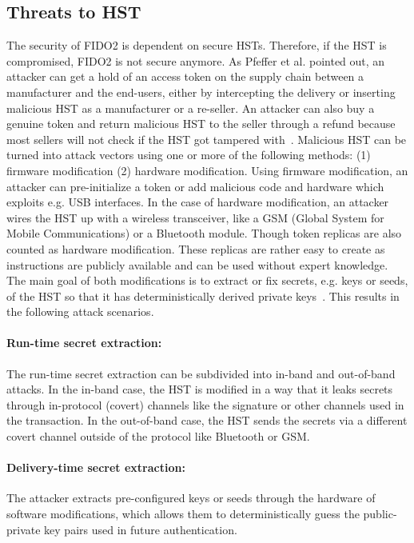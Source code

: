 \documentclass[runningheads]{llncs}
\begin{document}
\subsection{Threats to HST}
The security of FIDO2 is dependent on secure HSTs. Therefore, if the HST is compromised, FIDO2 is not secure anymore. As Pfeffer et al. pointed out, an attacker can get a hold of an access token on the supply chain between a manufacturer and the end-users, either by intercepting the delivery or inserting malicious HST as a manufacturer or a re-seller. An attacker can also buy a genuine token and return malicious HST to the seller through a refund because most sellers will not check if the HST got tampered with~\cite{000007}. Malicious HST can be turned into attack vectors using one or more of the following methods: (1) firmware modification (2) hardware modification. Using firmware modification, an attacker can pre-initialize a token or add malicious code and hardware which exploits e.g. USB interfaces. In the case of hardware modification, an attacker wires the HST up with a wireless transceiver, like a GSM (Global System for Mobile Communications) or a Bluetooth module. Though token replicas are also counted as hardware modification. These replicas are rather easy to create as instructions are publicly available and can be used without expert knowledge. The main goal of both modifications is to extract or fix secrets, e.g. keys or seeds, of the HST so that it has deterministically derived private keys~\cite{272198}. This results in the following attack scenarios.

\paragraph{Run-time secret extraction:}
The run-time secret extraction can be subdivided into in-band and out-of-band attacks. In the in-band case, the HST is modified in a way that it leaks secrets through in-protocol (covert) channels like the signature or other channels used in the transaction. In the out-of-band case, the HST sends the secrets via a different covert channel outside of the protocol like Bluetooth or GSM.

\paragraph{Delivery-time secret extraction:}
The attacker extracts pre-configured keys or seeds through the hardware of software modifications, which allows them to deterministically guess the public-private key pairs used in future authentication.
\end{document}
